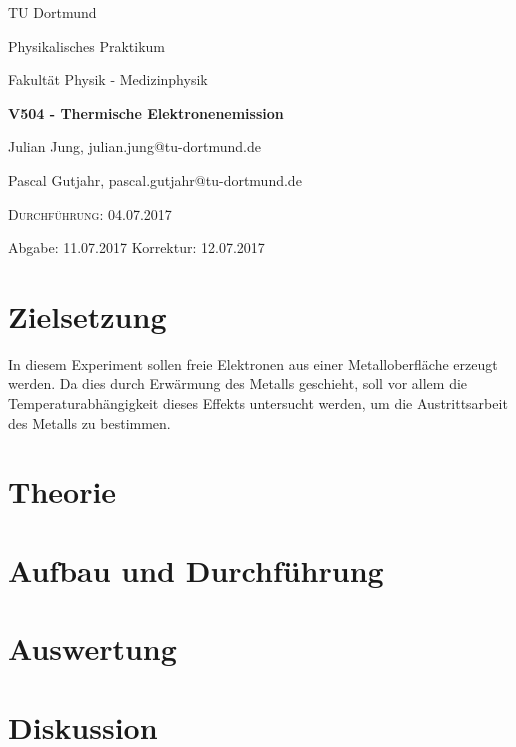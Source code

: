 


\begin{titlepage}
  \centering
  {\LARGE TU Dortmund \par}
  \vspace{0.75cm}
  {\Large Physikalisches Praktikum \par}
  \vspace{0.75cm}
  {\Large Fakultät Physik - Medizinphysik \par}
  \vspace{4cm}
  {\LARGE \bfseries V504 - Thermische Elektronenemission \par}
  \vspace{4cm}
  {\large Julian Jung, julian.jung@tu-dortmund.de \par \vspace{0.25cm}
  Pascal Gutjahr, pascal.gutjahr@tu-dortmund.de \par}
  \vspace{6cm}
  {\scshape Durchführung: 04.07.2017 \par \vspace{0.25cm}
  Abgabe: 11.07.2017 \vspace{3cm} 
  Korrektur: 12.07.2017}
\end{titlepage}
\newpage
\tableofcontents
\newpage
\section{Zielsetzung}
In diesem Experiment sollen freie Elektronen aus einer Metalloberfläche erzeugt werden.
Da dies durch Erwärmung des Metalls geschieht, soll vor allem die Temperaturabhängigkeit
dieses Effekts untersucht werden, um die Austrittsarbeit des Metalls zu bestimmen.
\section{Theorie}

\section{Aufbau und Durchführung}

\section{Auswertung}

\section{Diskussion}

\printbibliography

